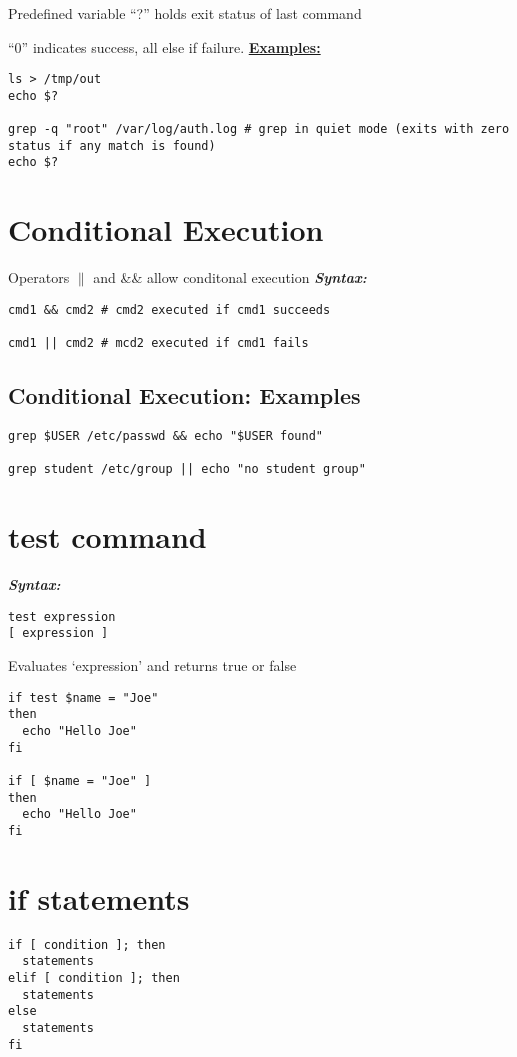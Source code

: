 \documentclass{report}
\begin{document}
\bigbreak \noindent
Predefined variable ``?'' holds exit status of last command \vspace{2mm}

\noindent ``0'' indicates success, all else if failure.
\newpage
\noindent \textbf{\underline{Examples:}}
\begin{verbatim}
ls > /tmp/out
echo $?

grep -q "root" /var/log/auth.log # grep in quiet mode (exits with zero status if any match is found)
echo $?
\end{verbatim}
\section{Conditional Execution}
Operators $\|$ and \&\& allow conditonal execution
\bigbreak \noindent
\textit{\textbf{Syntax:}}
\begin{verbatim}
cmd1 && cmd2 # cmd2 executed if cmd1 succeeds

cmd1 || cmd2 # mcd2 executed if cmd1 fails
\end{verbatim}
\subsection{Conditional Execution: Examples}
\begin{verbatim}
grep $USER /etc/passwd && echo "$USER found"

grep student /etc/group || echo "no student group"
\end{verbatim}
\section{test command}
\textit{\textbf{Syntax:}}
\begin{verbatim}
test expression
[ expression ]
\end{verbatim}
Evaluates `expression' and returns true or false
\begin{mdframed}
  \begin{verbatim}
if test $name = "Joe"
then
  echo "Hello Joe"
fi

if [ $name = "Joe" ]
then 
  echo "Hello Joe"
fi
\end{verbatim}
\end{mdframed}
\section{if statements}
\begin{verbatim}
if [ condition ]; then
  statements
elif [ condition ]; then
  statements
else
  statements
fi
\end{verbatim}
\newpage
\end{document}
